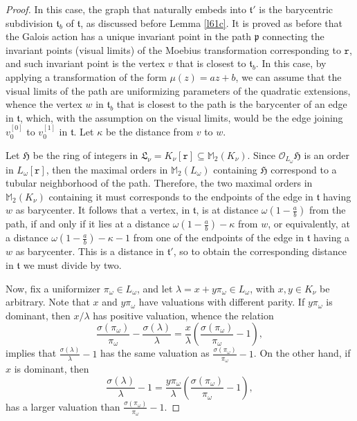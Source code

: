 \documentclass[10pt,a4paper]{amsart}
\begin{document}
\begin{proof}
    In this case, the graph that naturally embeds into 
    $\mathfrak{t}'$ is the barycentric subdivision 
    $\mathfrak{t}_b$ of $\mathfrak{t}$, as discussed
    before Lemma \ref{l61c}. It is proved
    as before that the Galois action has a unique invariant
    point in the path $\mathfrak{p}$ connecting the 
    invariant points (visual limits) of
    the Moebius transformation corresponding to
    $\mathtt{r}$, and such invariant
    point is the vertex $v$ that is closest
    to $\mathfrak{t}_b$. In this case, by applying
    a transformation of the form $\mu(z)=az+b$, 
    we can assume that the 
    visual limits of the path are uniformizing parameters 
    of the quadratic extensions, whence the vertex $w$ 
    in $\mathfrak{t}_b$
    that is closest to the path is the barycenter
    of an edge in $\mathfrak{t}$, which, with the 
    assumption on the visual limits, would be the
    edge joining $v_0^{[0]}$ to $v_0^{[1]}$ in
    $\mathfrak{t}$.
    Let $\kappa$ be the distance from $v$ to $w$.

    Let $\mathfrak{H}$ be the ring of integers in 
    $\mathfrak{L}_\nu=K_\nu[\mathtt{r}]
    \subseteq\mathbb{M}_2(K_\nu)$.
    Since $\mathcal{O}_{L_\omega}\mathfrak{H}$ is an order 
    in $L_\omega[\mathtt{r}]$,
    then the maximal orders in 
    $\mathbb{M}_2(L_\omega)$ containing
    $\mathfrak{H}$ correspond to a tubular neighborhood of the 
    path. Therefore, the two maximal orders in 
    $\mathbb{M}_2(K_\nu)$ containing it
    must corresponds to the endpoints of the edge in 
    $\mathfrak{t}$ having $w$ as barycenter. It follows
    that a vertex, in $\mathfrak{t}$, is at distance 
     $\omega\left(1-\frac ab\right)$ from the path,
     if and only if it lies at a distance 
     $\omega\left(1-\frac ab\right)-\kappa$ from $w$, or 
     equivalently,  at a distance 
     $\omega\left(1-\frac ab\right)-\kappa-1$ from one
     of the endpoints of the edge in 
    $\mathfrak{t}$ having a $w$ as barycenter. 
    This is a distance
    in  $\mathfrak{t}'$, so to obtain the corresponding
    distance in  $\mathfrak{t}$ we must divide by two.
    
    Now, fix a uniformizer $\pi_\omega\in L_\omega$, and
    let $\lambda=x+y\pi_\omega\in L_\omega$, 
    with $x,y\in K_\nu$ 
    be arbitrary. Note that $x$ and  
    $y\pi_\omega$ have valuations
    with different parity. If $y\pi_\omega$
    is dominant, then $x/\lambda$
    has positive valuation, whence the relation
    $$\frac{\sigma(\pi_\omega)}{\pi_\omega}-
    \frac{\sigma(\lambda)}{\lambda}=\frac x{\lambda}
    \left(\frac{\sigma(\pi_\omega)}{\pi_\omega}-1\right),$$
    implies that $\frac{\sigma(\lambda)}{\lambda}-1$ 
    has the same 
    valuation as $\frac{\sigma(\pi_\omega)}{\pi_\omega}-1$.
    On the other hand, if $x$ is dominant, then
    $$\frac{\sigma(\lambda)}{\lambda}-1=
    \frac {y\pi_\omega}{\lambda}
    \left(\frac{\sigma(\pi_\omega)}{\pi_\omega}-1\right),$$
    has a larger valuation than 
    $\frac{\sigma(\pi_\omega)}{\pi_\omega}-1$.


\end{proof}
\end{document}
